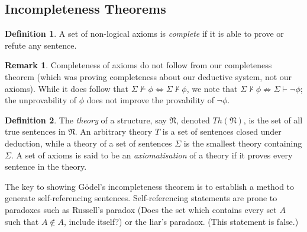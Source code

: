 \documentclass{article}
\theoremstyle{definition}
\newtheorem{defn}{Definition}[subsubsection]
\newtheorem{rmk}{Remark}[subsubsection]
\begin{document}
\subsection{Incompleteness Theorems}
\begin{defn}
	A set of non-logical axioms is \emph{complete} if it is able to prove or refute any sentence.
\end{defn}
\begin{rmk}
	Completeness of axioms do not follow from our completeness theorem (which was proving completeness about our deductive system, not our axioms). While it does follow that $\Sigma\not\models\phi\iff\Sigma\not\vdash\phi$, we note that $\Sigma\not\vdash\phi\not\Rightarrow\Sigma\vdash\neg\phi$; the unprovability of $\phi$ does not improve the provability of $\neg\phi$.
\end{rmk}
\begin{defn}
	The \emph{theory} of a structure, say $\mathfrak{N}$, denoted $Th(\mathfrak{N})$, is the set of all true sentences in $\mathfrak{N}$. An arbitrary theory $T$ is a set of sentences closed under deduction, while a theory of a set of sentences $\Sigma$ is the smallest theory containing $\Sigma$.
	A set of axioms is said to be an \emph{axiomatisation} of a theory if it proves every sentence in the theory.
\end{defn}
The key to showing G\"{o}del's incompleteness theorem is to establish a method to generate self-referencing sentences. Self-referencing statements are prone to paradoxes such as Russell's paradox (Does the set which contains every set $A$ such that $A\not\in A$, include itself?) or the liar's paradaox. (This statement is false.)
\end{document}

